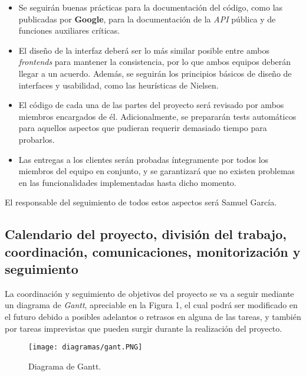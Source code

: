 \documentclass[11pt, a4paper, titlepage]{article}
\begin{document}
\begin{itemize}
    \item Se seguirán buenas prácticas para la documentación del código, como las publicadas por \textbf{Google}\cite{documentaciongoogle}, para la documentación de la \textit{API} pública y de funciones auxiliares críticas.
    
    \item El diseño de la interfaz deberá ser lo más similar posible entre ambos \textit{frontends} para mantener la consistencia, por lo que ambos equipos deberán llegar a un acuerdo. Además, se seguirán los principios básicos de diseño de interfaces y usabilidad, como las heurísticas de Nielsen\cite{heuristicasnielsen}.
    
    \item El código de cada una de las partes del proyecto será revisado por ambos miembros encargados de él. Adicionalmente, se prepararán tests automáticos para aquellos aspectos que pudieran requerir demasiado tiempo para probarlos.
    
    \item Las entregas a los clientes serán probadas íntegramente por todos los miembros del equipo en conjunto, y se garantizará que no existen problemas en las funcionalidades implementadas hasta dicho momento.
\end{itemize}

El responsable del seguimiento de todos estos aspectos será Samuel García.

\subsection{Calendario del proyecto, división del trabajo, coordinación, comunicaciones, monitorización y seguimiento}

La coordinación y seguimiento de objetivos del proyecto se va a seguir mediante un diagrama de \textit{Gantt}, apreciable en la Figura 1, el cual podrá ser modificado en el futuro debido a posibles adelantos o retrasos en alguna de las tareas, y también por tareas imprevistas que pueden surgir durante la realización del proyecto.\\

\begin{landscape}
    \pagestyle{empty}
    \begin{figure}[!p]
    \centering
    \texttt{[image: diagramas/gant.PNG]}
    \caption{Diagrama de Gantt.}
    \label{fig:my_label}
\end{figure}
\end{landscape}
\end{document}
